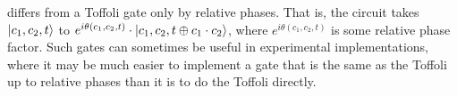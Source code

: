 \vspace{-5pt}
differs from a Toffoli gate only by relative phases.  That is, the circuit takes $\ket{c_1, c_2, t}$ to $e^{i\theta(c_1,c_2,t)}\cdot \ket{c_1,c_2,t\oplus c_1\cdot c_2}$, where $e^{i\theta(c_1,c_2,t)}$ is some relative phase factor. Such gates can sometimes be useful in experimental implementations, where it may be much easier to implement a gate that is the same as the Toffoli up to relative phases than it is to do the Toffoli directly.
\begin{comment}
\Soln Note that $R_y(\pm\pi) = \mp iY = \begin{bmatrix} 0 & \mp1 \\ \pm 1 & 0 \end{bmatrix}$, which maps $\ket{0} \rightarrow \pm \ket{1}$ and $\ket{1}\rightarrow\mp\ket{0}$. Now, we trace the effects of the circuit on the computational basis.
\vspace{-10pt}
\begin{center}
\begin{tabular}{c|r|r|r|r|r|r|r|} 
\multicolumn{1}{c|}{$\ket{x_1x_2x_3}$} & \multicolumn{1}{c|}{$R_{y_1}$} & \multicolumn{1}{c|}{$CX_1$} & \multicolumn{1}{c|}{$R_{y_2}$ } & \multicolumn{1}{c|}{$CX_2$} & \multicolumn{1}{c|}{$R_{y_3}$ } & \multicolumn{1}{c|}{$CX_3$} & \multicolumn{1}{c|}{$R_{y_4}$} \\
\hline
$\ket{000}$ & $\ket{001}$ & $\ket{001}$ & $-\ket{000}$ & $-\ket{000}$ & $\ket{001}$ & $\ket{001}$ & $\ket{000}$ \\
\hline
$\ket{001}$ & $-\ket{000}$ & $-\ket{000}$ & $-\ket{001}$ & $-\ket{001}$ & $-\ket{000}$ & $-\ket{000}$ & $\ket{001}$ \\
\hline
$\ket{010}$ & $\ket{011}$ & $\ket{010}$ & $\ket{011}$ & $\ket{011}$ & $\ket{010}$ & $\ket{011}$ & $\ket{010}$ \\
\hline
$\ket{011}$ & $-\ket{010}$ & $-\ket{011}$ & $\ket{010}$ & $\ket{010}$ & $-\ket{011}$ & $-\ket{010}$ & $\ket{011}$ \\
\hline
$\ket{100}$ & $\ket{101}$ & $\ket{101}$ & $-\ket{100}$ & $-\ket{101}$ & $-\ket{100}$ & $-\ket{100}$ & $\ket{101}$ \\
\hline
$\ket{101}$ & $-\ket{100}$ & $-\ket{100}$ & $-\ket{101}$ & $-\ket{100}$ & $\ket{101}$ & $\ket{101}$ & $\ket{100}$ \\
\hline
$\ket{110}$ & $\ket{111}$ & $\ket{110}$ & $\ket{111}$ & $\ket{110}$ & $-\ket{111}$ & $-\ket{110}$ & $\ket{111}$ \\
\hline
$\ket{111}$ & $-\ket{110}$ & $-\ket{111}$ & $\ket{110}$  & $\ket{111}$ & $\ket{110}$ & $\ket{111}$ & $\ket{110}$ 
\end{tabular}
\end{center}
\vspace{-10pt}
That didn't work out ... it incorrectly maps $\ket{100}\rightarrow\ket{101}$ and $\ket{100}\rightarrow{101}$, effectively, this is just \CNOT$(x_1,x_3)$.
\end{comment}
